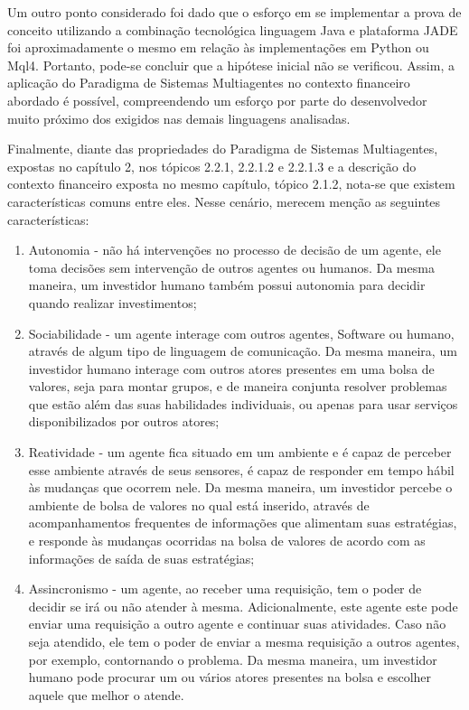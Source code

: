 Um outro ponto considerado foi dado que o esforço em se implementar a prova de conceito utilizando a combinação tecnológica linguagem Java e plataforma JADE foi aproximadamente o mesmo em relação às implementações em Python ou Mql4. Portanto, pode-se concluir que a hipótese inicial não se verificou. Assim, a aplicação do Paradigma de Sistemas Multiagentes no contexto financeiro abordado é possível, compreendendo um esforço por parte do desenvolvedor muito próximo dos exigidos nas demais linguagens analisadas.

Finalmente, diante das propriedades do Paradigma de Sistemas Multiagentes, expostas no capítulo 2, nos tópicos 2.2.1, 2.2.1.2 e 2.2.1.3 e a descrição do contexto financeiro exposta no mesmo capítulo, tópico 2.1.2, nota-se que existem características comuns entre eles. Nesse cenário, merecem menção as seguintes características:

\begin{enumerate}
\item Autonomia - não há intervenções no processo de decisão de um agente, ele toma decisões sem intervenção de outros agentes ou humanos. Da mesma maneira, um investidor humano também possui autonomia para decidir quando realizar investimentos;
\item Sociabilidade - um agente interage com outros agentes, Software ou humano, através de  algum tipo de linguagem de comunicação. Da mesma maneira, um investidor humano interage com outros atores presentes em uma bolsa de valores, seja para montar grupos, e de maneira conjunta resolver problemas que estão além das suas habilidades individuais, ou apenas para usar serviços disponibilizados por outros atores;
\item Reatividade - um agente fica situado em um ambiente e é capaz de perceber esse ambiente através de seus sensores, é capaz de responder em tempo hábil às mudanças que ocorrem nele. Da mesma maneira, um investidor percebe o ambiente de bolsa de valores no qual está inserido, através de acompanhamentos frequentes de informações que alimentam suas estratégias, e responde às mudanças ocorridas na bolsa de valores de acordo com as informações de saída de suas estratégias;
\item Assincronismo -  um agente, ao receber uma requisição, tem o poder de decidir se irá ou não atender à mesma. Adicionalmente, este agente este pode enviar uma requisição a outro agente e continuar suas atividades. Caso não seja atendido, ele tem o poder de enviar a mesma requisição a outros agentes, por exemplo, contornando o problema. Da mesma maneira, um investidor humano pode procurar um ou vários atores presentes na bolsa e escolher aquele que melhor o atende.

\end{enumerate}

